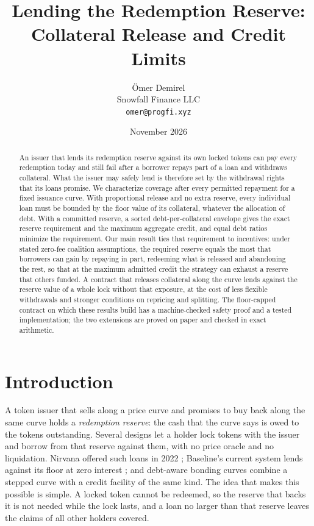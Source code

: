 \documentclass[11pt,a4paper]{article}
\title{\textbf{Lending the Redemption Reserve:\\ Collateral Release and Credit Limits}}
\author{\"Omer Demirel\\[2pt] {\normalsize Snowfall Finance LLC}\\[2pt] {\normalsize\texttt{omer@progfi.xyz}}}
\date{November 2026}
\theoremstyle{plain}
\theoremstyle{definition}
\theoremstyle{remark}
\newcommand{\vone}{\citep{dabc2026}}
\begin{document}
\maketitle

\begin{abstract}
\noindent
An issuer that lends its redemption reserve against its own locked tokens can pay every redemption today and still fail after a borrower repays part of a loan and withdraws collateral. What the issuer may safely lend is therefore set by the withdrawal rights that its loans promise. We characterize coverage after every permitted repayment for a fixed issuance curve. With proportional release and no extra reserve, every individual loan must be bounded by the floor value of its collateral, whatever the allocation of debt. With a committed reserve, a sorted debt-per-collateral envelope gives the exact reserve requirement and the maximum aggregate credit, and equal debt ratios minimize the requirement. Our main result ties that requirement to incentives: under stated zero-fee coalition assumptions, the required reserve equals the most that borrowers can gain by repaying in part, redeeming what is released and abandoning the rest, so that at the maximum admitted credit the strategy can exhaust a reserve that others funded. A contract that releases collateral along the curve lends against the reserve value of a whole lock without that exposure, at the cost of less flexible withdrawals and stronger conditions on repricing and splitting. The floor-capped contract on which these results build has a machine-checked safety proof and a tested implementation; the two extensions are proved on paper and checked in exact arithmetic.
\end{abstract}

\section{Introduction}

A token issuer that sells along a price curve and promises to buy back along the same curve holds a \emph{redemption reserve}: the cash that the curve says is owed to the tokens outstanding. Several designs let a holder lock tokens with the issuer and borrow from that reserve against them, with no price oracle and no liquidation. Nirvana offered such loans in 2022 \citep{nirvanadocs}; Baseline's current system lends against its floor at zero interest \citep{baselinedocs}; and debt-aware bonding curves \vone{} combine a stepped curve with a credit facility of the same kind. The idea that makes this possible is simple. A locked token cannot be redeemed, so the reserve that backs it is not needed while the lock lasts, and a loan no larger than that reserve leaves the claims of all other holders covered.
\end{document}
